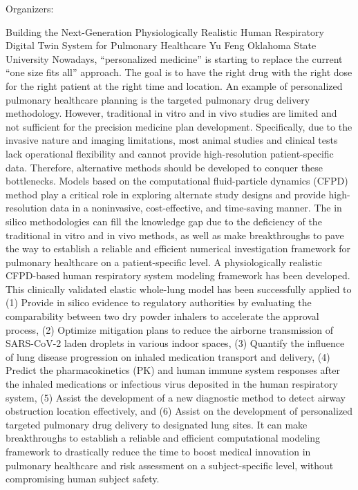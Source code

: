 \label{mini28}

\miniabs
{}
{Organizers: }
{}

\vspace{2ex}
\abs
{Building the Next-Generation Physiologically Realistic Human Respiratory Digital Twin System for Pulmonary Healthcare}
{Yu Feng}
{Oklahoma State University}
{Nowadays, ``personalized medicine'' is starting to replace the current ``one size fits all'' approach. The goal is to have the right drug with the right dose for the right patient at the right time and location. An example of personalized pulmonary healthcare planning is the targeted pulmonary drug delivery methodology. However, traditional in vitro and in vivo studies are limited and not sufficient for the precision medicine plan development. Specifically, due to the invasive nature and imaging limitations, most animal studies and clinical tests lack operational flexibility and cannot provide high-resolution patient-specific data. Therefore, alternative methods should be developed to conquer these bottlenecks. Models based on the computational fluid-particle dynamics (CFPD) method play a critical role in exploring alternate study designs and provide high-resolution data in a noninvasive, cost-effective, and time-saving manner. The in silico methodologies can fill the knowledge gap due to the deficiency of the traditional in vitro and in vivo methods, as well as make breakthroughs to pave the way to establish a reliable and efficient numerical investigation framework for pulmonary healthcare on a patient-specific level. A physiologically realistic CFPD-based human respiratory system modeling framework has been developed. This clinically validated elastic whole-lung model has been successfully applied to (1) Provide in silico evidence to regulatory authorities by evaluating the comparability between two dry powder inhalers to accelerate the approval process, (2) Optimize mitigation plans to reduce the airborne transmission of SARS-CoV-2 laden droplets in various indoor spaces, (3) Quantify the influence of lung disease progression on inhaled medication transport and delivery, (4) Predict the pharmacokinetics (PK) and human immune system responses after the inhaled medications or infectious virus deposited in the human respiratory system, (5) Assist the development of a new diagnostic method to detect airway obstruction location effectively, and (6) Assist on the development of personalized targeted pulmonary drug delivery to designated lung sites. It can make breakthroughs to establish a reliable and efficient computational modeling framework to drastically reduce the time to boost medical innovation in pulmonary healthcare and risk assessment on a subject-specific level, without compromising human subject safety.}


